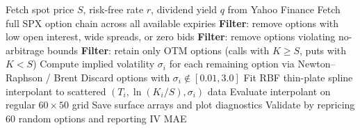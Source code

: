 \documentclass[12pt, a4paper]{article}
\begin{document}
\begin{algorithm}[H]
\caption{SPX Implied Volatility Surface Construction}
\label{alg:pipeline}
\begin{algorithmic}[1]
\State Fetch spot price $S$, risk-free rate $r$, dividend yield $q$ from Yahoo Finance
\State Fetch full SPX option chain across all available expiries
\State \textbf{Filter}: remove options with low open interest, wide spreads, or zero bids
\State \textbf{Filter}: remove options violating no-arbitrage bounds
\State \textbf{Filter}: retain only OTM options (calls with $K \geq S$, puts with $K < S$)
\State Compute implied volatility $\sigma_i$ for each remaining option via Newton--Raphson / Brent
\State Discard options with $\sigma_i \notin [0.01, 3.0]$
\State Fit RBF thin-plate spline interpolant to scattered $(T_i, \ln(K_i/S), \sigma_i)$ data
\State Evaluate interpolant on regular $60 \times 50$ grid
\State Save surface arrays and plot diagnostics
\State Validate by repricing 60 random options and reporting IV MAE
\end{algorithmic}
\end{algorithm}

\printbibliography[heading=bibintoc, title={References}]
\end{document}
